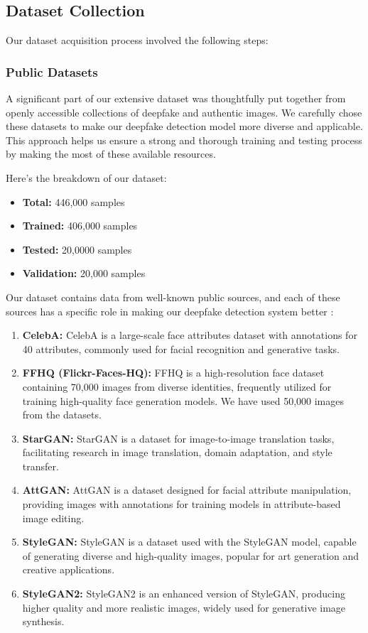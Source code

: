 \subsection{Dataset Collection}

\noindent Our dataset acquisition process involved the following steps:


\subsubsection{Public Datasets}
A significant part of our extensive dataset was thoughtfully put together from openly accessible collections of deepfake and authentic images. We carefully chose these datasets to make our deepfake detection model more diverse and applicable. This approach helps us ensure a strong and thorough training and testing process by making the most of these available resources.

Here's the breakdown of our dataset:
\begin{itemize}
    \item \textbf{Total:} 446,000 samples
    \item \textbf{Trained:} 406,000 samples
    \item \textbf{Tested:} 20,0000 samples
    \item \textbf{Validation:} 20,000 samples
\end{itemize}
Our dataset contains data from well-known public sources, and each of these sources has a specific role in making our deepfake detection system better :

\begin{enumerate}
\item \textbf{CelebA:} CelebA is a large-scale face attributes dataset with annotations for 40 attributes, commonly used for facial recognition and generative tasks.

\item \textbf{FFHQ (Flickr-Faces-HQ):} FFHQ is a high-resolution face dataset containing 70,000 images from diverse identities, frequently utilized for training high-quality face generation models. We have used 50,000 images from the datasets.

\item \textbf{StarGAN:} StarGAN is a dataset for image-to-image translation tasks, facilitating research in image translation, domain adaptation, and style transfer.

\item \textbf{AttGAN:} AttGAN is a dataset designed for facial attribute manipulation, providing images with annotations for training models in attribute-based image editing.

\item \textbf{StyleGAN:} StyleGAN is a dataset used with the StyleGAN model, capable of generating diverse and high-quality images, popular for art generation and creative applications.

\item \textbf{StyleGAN2:} StyleGAN2 is an enhanced version of StyleGAN, producing higher quality and more realistic images, widely used for generative image synthesis.

\end{enumerate}


